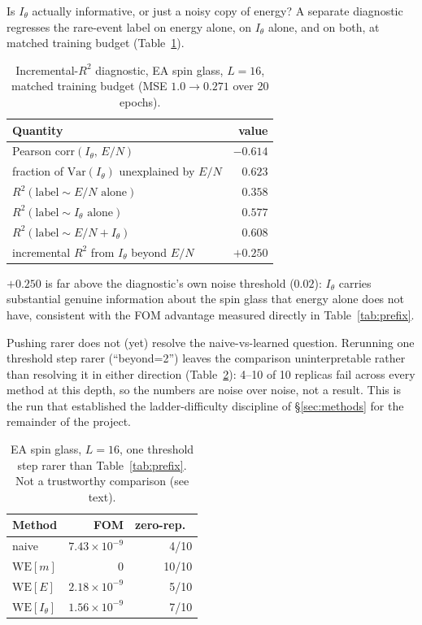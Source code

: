 \documentclass[a4paper,fleqn]{cas-sc}
\begin{document}
Is $I_\theta$ actually informative, or just a noisy copy of energy? A separate
diagnostic regresses the rare-event label on energy alone, on $I_\theta$ alone, and on
both, at matched training budget (Table~\ref{tab:diagnostic}).

\begin{table}[H]
\centering\small
\caption{Incremental-$R^2$ diagnostic, EA spin glass, $L=16$, matched training budget
	(MSE $1.0\to0.271$ over 20 epochs).}
\label{tab:diagnostic}
\begin{tabular}{lr}
	\toprule
	Quantity & value \\
	\midrule
	Pearson corr$(I_\theta,\,E/N)$ & $-0.614$ \\
	fraction of $\mathrm{Var}(I_\theta)$ unexplained by $E/N$ & $0.623$ \\
	$R^2(\text{label}\sim E/N\text{ alone})$ & $0.358$ \\
	$R^2(\text{label}\sim I_\theta\text{ alone})$ & $0.577$ \\
	$R^2(\text{label}\sim E/N+I_\theta)$ & $0.608$ \\
	incremental $R^2$ from $I_\theta$ beyond $E/N$ & $+0.250$ \\
	\bottomrule
\end{tabular}
\end{table}

$+0.250$ is far above the diagnostic's own noise threshold ($0.02$): $I_\theta$ carries
substantial genuine information about the spin glass that energy alone does not have,
consistent with the FOM advantage measured directly in Table~\ref{tab:prefix}.

Pushing rarer does not (yet) resolve the naive-vs-learned question. Rerunning one
threshold step rarer (``beyond=2'') leaves the comparison uninterpretable rather than
resolving it in either direction (Table~\ref{tab:beyond2}): 4--10 of 10 replicas fail
across every method at this depth, so the numbers are noise over noise, not a result. This
is the run that established the ladder-difficulty discipline of \S\ref{sec:methods} for the
remainder of the project.

\begin{table}[H]
\centering\small
\caption{EA spin glass, $L=16$, one threshold step rarer than Table~\ref{tab:prefix}. Not a
	trustworthy comparison (see text).}
\label{tab:beyond2}
\begin{tabular}{lrr}
	\toprule
	Method & FOM & zero-rep.\ \\
	\midrule
	naive & $7.43\times10^{-9}$ & 4/10 \\
	$\mathrm{WE}[m]$ & $0$ & 10/10 \\
	$\mathrm{WE}[E]$ & $2.18\times10^{-9}$ & 5/10 \\
	$\mathrm{WE}[I_\theta]$ & $1.56\times10^{-9}$ & 7/10 \\
	\bottomrule
\end{tabular}
\end{table}
\end{document}
